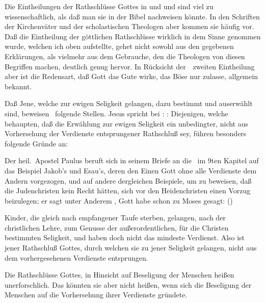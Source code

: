 \begin{aufza}
\begin{aufzb}
\end{aufzb}
\item Die Eintheilungen der Rathschlüsse Gottes in  und  und  sind viel zu wissenschaftlich, als daß man sie in der Bibel nachweisen könnte. In den Schriften der Kirchenväter und der scholastischen Theologen aber kommen sie häufig vor. Daß die Eintheilung der göttlichen Rathschlüsse wirklich in dem Sinne genommen wurde, welchen ich oben aufstellte, gehet nicht sowohl aus den gegebenen Erklärungen, als vielmehr aus dem Gebrauche, den die Theologen von diesen Begriffen machen, deutlich genug hervor. In Rücksicht der~\ zweiten Eintheilung aber ist die Redensart, daß Gott das Gute wirke, das Böse nur zulasse, allgemein bekannt.
\item Daß Jene, welche zur ewigen Seligkeit gelangen, dazu bestimmt und auserwählt sind, beweisen \zB\ folgende Stellen. Jesus spricht bei :  :  Diejenigen, welche behaupten, daß die Erwählung zur ewigen Seligkeit ein unbedingter, nicht aus Vorhersehung der Verdienste entsprungener Rathschluß sey, führen besonders folgende Gründe an:
\begin{aufzb}
\item Der heil.\ Apostel Paulus beruft sich in seinem Briefe an die \ im 9ten Kapitel auf das Beispiel Jakob's und Esau's, deren den Einen Gott ohne alle Verdienste dem Andern vorgezogen, und auf andere dergleichen Beispiele, um zu beweisen, daß die Judenchristen kein Recht hätten, sich vor den Heidenchristen einen Vorzug beizulegen; er sagt unter Anderem , Gott habe schon zu Moses gesagt:  ()
\item Kinder, die gleich nach empfangener Taufe sterben, gelangen, nach der christlichen Lehre, zum Genusse der außerordentlichen, für die Christen bestimmten Seligkeit, und haben doch nicht das mindeste Verdienst. Also ist jener Rathschluß Gottes, durch welchen sie zu jener Seligkeit gelangen, nicht aus dem vorhergesehenen Verdienste entsprungen.
\item Die Rathschlüsse Gottes, in Hinsicht auf Beseligung der Menschen heißen unerforschlich. Das könnten sie aber nicht heißen, wenn sich die Beseligung der Menschen auf die Vorhersehung ihrer Verdienste gründete.

\end{aufzb}
\end{aufza}

